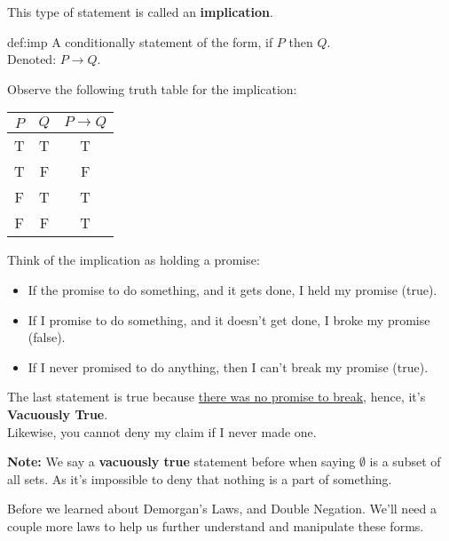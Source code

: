 \newpage

\noindent
This type of statement is called an \textbf{implication}.
\begin{Def}[Implication]{def:imp}
    A conditionally statement of the form, if $P$ then $Q$.\\
    Denoted: $P \rightarrow Q$.
\end{Def}

\noindent
Observe the following truth table for the implication:

\begin{center}
    \begin{tabular}{|c|c|c|}
        \hline
        \rowcolor{OliveGreen!10}
        $P$ & $Q$ & $P \rightarrow Q$ \\
        \hline
        T   & T   & T                 \\
        T   & F   & F                 \\
        F   & T   & T                 \\
        F   & F   & T                 \\
        \hline
    \end{tabular}
\end{center}

\noindent
Think of the implication as holding a promise:
\begin{itemize}
    \item If the promise to do something, and it gets done, I held my promise (true).
    \item If I promise to do something, and it doesn't get done, I broke my promise (false).
    \item If I never promised to do anything, then I can't break my promise (true).
\end{itemize}
The last statement is true because \underline{there was no promise to break,} hence, it's \textbf{Vacuously True}.\\
Likewise, you cannot deny my claim if I never made one.\\

\begin{Note}
    \textbf{Note:} We say a \textbf{vacuously true} statement before when saying $\emptyset$ is a subset of all sets.
    As it's impossible to deny that nothing is a part of something.
\end{Note}

\noindent


\noindent
Before we learned about Demorgan's Laws, and Double Negation. We'll need a couple more laws
to help us further understand and manipulate these forms.\\

